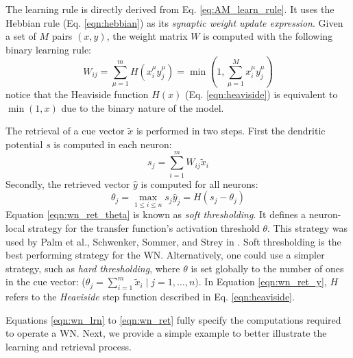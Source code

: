 \documentclass[runningheads]{llncs}
\begin{document}
The learning rule is directly derived from Eq. \ref{eq:AM_learn_rule}. It uses the Hebbian rule (Eq. \ref{eqn:hebbian}) as its \textit{synaptic weight update expression}. Given a set of $M$ pairs $(x,y)$, the weight matrix $W$ is computed with the following binary learning rule: 
\begin{equation}
W_{ij}= 
\sum_{\mu=1}^{m}H\left( x_{i}^{\mu} y_{j}^{\mu} \right)
=\min \left(1, \sum_{\mu=1}^{M} x_{i}^{\mu} y_{j}^{\mu}\right)
\label{eqn:wn_lrn}
\end{equation}
notice that the Heaviside function $H(x)$ (Eq. \ref{eqn:heaviside}) is equivalent to $\min(1,x)$ due to the binary nature of the model.
\newline

The retrieval of a cue vector $\tilde{x}$ is performed in two steps. First the dendritic potential $s$ is computed in each neuron:
\begin{equation}
\label{eqn:dendritic}
    s_{j}=\sum_{i=1}^{m} W_{i j} \tilde{x}_{i}
\end{equation}
Secondly, the retrieved vector $\hat{y}$ is computed for all neurons:
\begin{subequations}
\label{eqn:wn_ret}
\begin{equation}
    \theta_{j}=\max _{1 \leq i \leq n} s_j
\label{eqn:wn_ret_theta}
\end{equation}
\begin{equation}
\label{eqn:wn_ret_y}
    \hat{y}_{j}=H\left(s_{j}-\theta_{j}\right)
\end{equation}
\end{subequations}
Equation \ref{eqn:wn_ret_theta} is known as\textit{ soft thresholding}. It defines a neuron-local strategy for the transfer function's activation threshold $\theta$. This strategy was used by Palm et al., Schwenker, Sommer, and Strey in \cite{palm1992information,gunther1997neural}. Soft thresholding is the best performing strategy for the WN. Alternatively, one could use a simpler strategy, such as \textit{hard thresholding}, where $\theta$ is set globally to the number of ones in the cue vector: ($\theta_j=\sum_{i=1}^{m} \tilde{x}_i \mid j=1, \dots , n)$.
In Equation \ref{eqn:wn_ret_y}, $H$ refers to the \textit{Heaviside} step function described in Eq. \ref{eqn:heaviside}.

Equations \ref{eqn:wn_lrn} to \ref{eqn:wn_ret} fully specify the computations required to operate a WN. Next, we provide a simple example to better illustrate the learning and retrieval process.
\end{document}
